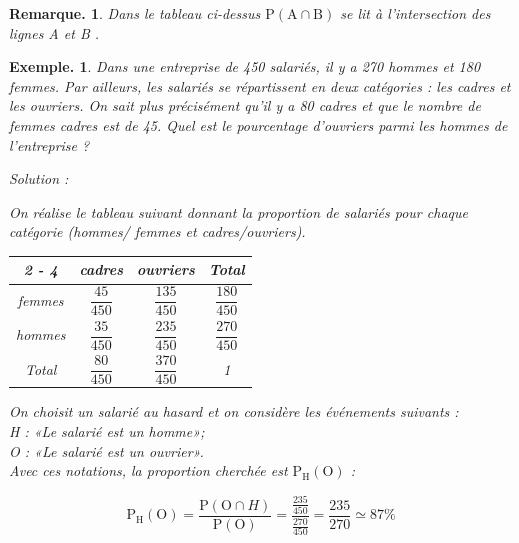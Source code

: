 \documentclass[12pt]{article}
\theoremstyle{break}
\newtheorem*{example}{Exemple.}
\newtheorem*{remark}{Remarque.}
\begin{document}
\begin{remark}
Dans le tableau ci-dessus $\mathrm{P}(\mathrm{A} \cap \mathrm{B})$ se lit à l'intersection des lignes A et B .

% 
\end{remark}

\begin{example}
Dans une entreprise de 450 salariés, il y a 270 hommes et 180 femmes.
Par ailleurs, les salariés se répartissent en deux catégories : les cadres et les ouvriers.
On sait plus précisément qu'il y a 80 cadres et que le nombre de femmes cadres est de 45.
Quel est le pourcentage d'ouvriers parmi les hommes de l'entreprise ?

Solution :

On réalise le tableau suivant donnant la proportion de salariés pour chaque catégorie (hommes/ femmes et cadres/ouvriers).

\begin{center}
\renewcommand{\arraystretch}{2.5}
\begin{tabular}{|c|c|c|c|}
\cline { 2 - 4 }
\multicolumn{1}{c|}{} & cadres & ouvriers & Total \\
\hline
femmes & $\dfrac{45}{450}$ & $\dfrac{135}{450}$ & $\dfrac{180}{450}$ \\
\hline
hommes & $\dfrac{35}{450}$ & $\dfrac{235}{450}$ & $\dfrac{270}{450}$ \\
\hline
Total & $\dfrac{80}{450}$ & $\dfrac{370}{450}$ & 1 \\
\hline
\end{tabular}
\end{center}

On choisit un salarié au hasard et on considère les événements suivants :\\
H : «Le salarié est un homme»;\\
O : «Le salarié est un ouvrier».\\
Avec ces notations, la proportion cherchée est $\mathrm{P}_{\mathrm{H}}(\mathrm{O})$ :

$$
\mathrm{P}_{\mathrm{H}}(\mathrm{O})=\frac{\mathrm{P}(\mathrm{O} \cap H)}{\mathrm{P}(\mathrm{O})}=\dfrac{\frac{235}{450}}{\frac{270}{450}}=\dfrac{235}{270} \simeq 87 \%
$$
\end{example}
\end{document}
